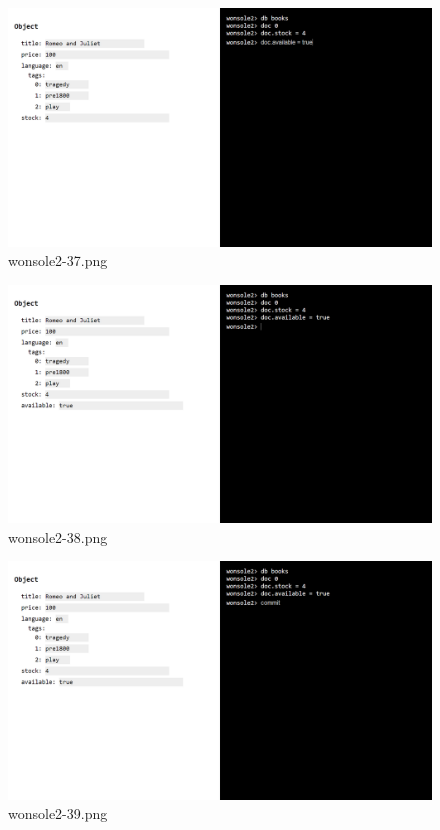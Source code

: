 \clearpage
\begin{figure}
\includegraphics[width=\textwidth]{screenshot/wonsole2/wonsole2-37.png}
\caption{wonsole2-37.png}
\label{wonsole2-37.png}
\end{figure}


\begin{figure}
\includegraphics[width=\textwidth]{screenshot/wonsole2/wonsole2-38.png}
\caption{wonsole2-38.png}
\label{wonsole2-38.png}
\end{figure}


\clearpage
\begin{figure}
\includegraphics[width=\textwidth]{screenshot/wonsole2/wonsole2-39.png}
\caption{wonsole2-39.png}
\label{wonsole2-39.png}
\end{figure}


